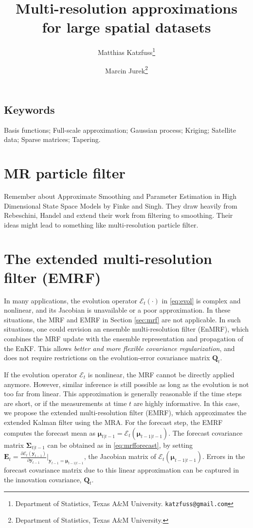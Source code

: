 \documentclass[12pt,letterpaper]{article}
\title{Multi-resolution approximations for large spatial datasets}
\author{Matthias Katzfuss\thanks{Department of Statistics, Texas A\&M University. \texttt{katzfuss@gmail.com}} \and Marcin Jurek\thanks{Department of Statistics, Texas A\&M University.}}
\theoremstyle{propstyle}
\theoremstyle{propstyle}
\newcommand{\evol}{\mathcal{E}}
\newcommand{\levol}{\mathbf{E}}
\newcommand{\by}{\mathbf{y}}
\newcommand{\bQ}{\mathbf{Q}}
\newcommand{\bfmu}{\bm{\mu}}
\newcommand{\bfSigma}{\bm{\Sigma}}
\begin{document}
\maketitle

\begin{abstract}



\end{abstract}

\subsection*{Keywords}
Basis functions; Full-scale approximation; Gaussian process; Kriging; Satellite data; Sparse matrices; Tapering.


\section{MR particle filter}
Remember about Approximate Smoothing and Parameter Estimation in High Dimensional State Space Models by Finke and Singh. They draw heavily from Rebeschini, Handel and extend their work from filtering to smoothing. Their ideas might lead to something like multi-resolution particle filter.



\section{The extended multi-resolution filter (EMRF) \label{sec:emrf}} 

In many applications, the evolution operator $\evol_t(\cdot)$ in \eqref{eq:evol} is complex and nonlinear, and its Jacobian is unavailable or a poor approximation. In these situations, the MRF and EMRF in Section \ref{sec:mrf} are not applicable. In such situations, one could envision an ensemble multi-resolution filter (EnMRF), which combines the MRF update with the ensemble representation and propagation of the EnKF. This allows \emph{better and more flexible covariance regularization}, and does not require restrictions on the evolution-error covariance matrix $\bQ_t$.

If the evolution operator $\evol_t$ is nonlinear, the MRF cannot be directly applied anymore. However, similar inference is still possible as long as the evolution is not too far from linear. This approximation is generally reasonable if the time steps are short, or if the measurements at time $t$ are highly informative. In this case, we propose the extended multi-resolution filter (EMRF), which approximates the extended Kalman filter \citep[e.g.,][Ch.~5]{Grewal1993} using the MRA. For the forecast step, the EMRF computes the forecast mean as $\bfmu_{t|t-1} = \evol_t(\bfmu_{t-1|t-1})$. The forecast covariance matrix $\bfSigma_{t|t-1}$ can be obtained as in \eqref{eq:mrfforecast}, by setting $\levol_t = \frac{\partial \evol_t(\by_{t-1})}{\partial \by_{t-1}} \big|_{\by_{t-1} = \bfmu_{t-1|t-1} }$, the Jacobian matrix of $\evol_t(\bfmu_{t-1|t-1})$.  Errors in the forecast covariance matrix due to this linear approximation can be captured in the innovation covariance, $\bQ_t$.
\end{document}
